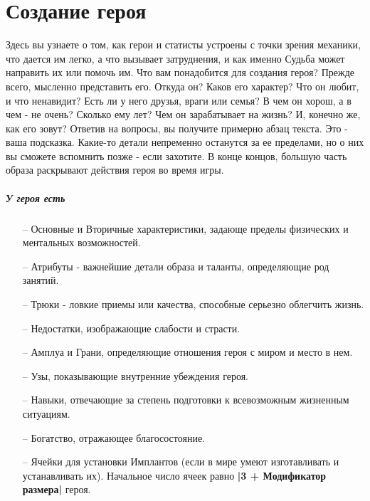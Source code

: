 \chapter{Создание героя}
Здесь вы узнаете о том, как герои и статисты устроены с точки зрения механики, что дается им легко, а что вызывает затруднения, и как именно Судьба может направить их или помочь им.
\newline Что вам понадобится для создания героя? Прежде всего, мысленно представить его. Откуда он? Каков его характер? Что он любит, и что ненавидит? Есть ли у него друзья, враги или семья? В чем он хорош, а в чем - не очень? Сколько ему лет? Чем он зарабатывает на жизнь? И, конечно же, как его зовут?
\newline Ответив на вопросы, вы получите примерно абзац текста. Это - ваша подсказка. Какие-то детали непременно останутся за ее пределами, но о них вы сможете вспомнить позже - если захотите. В конце концов, большую часть образа раскрывают действия героя во время игры. 

\paragraph{У героя есть}
\begin{itemize}
\item[--] Основные и Вторичные характеристики, задающе пределы физических и ментальных возможностей.
\item[--] Атрибуты - важнейшие детали образа и таланты, определяющие род занятий.
\item[--] Трюки - ловкие приемы или качества, способные серьезно облегчить жизнь.
\item[--] Недостатки, изображающие слабости и страсти.
\item[--] Амплуа и Грани, определяющие отношения героя с миром и место в нем.
\item[--] Узы, показывающие внутренние убеждения героя.
\item[--] Навыки, отвечающие за степень подготовки к всевозможным жизненным ситуациям.
\item[--] Богатство, отражающее благосостояние.
\item[--] Ячейки для установки Имплантов (если в мире умеют изготавливать и устанавливать их). Начальное число ячеек равно \textbf{|3 + Модификатор размера|} героя.
\end{itemize}



